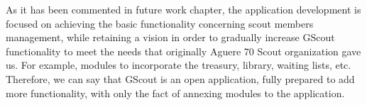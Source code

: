 As it has been commented in future work  chapter, the application development is focused on achieving the basic functionality 
concerning scout members management, while retaining a vision in order to gradually increase GScout functionality 
to meet the needs that originally Aguere 70 Scout organization gave us. For example, modules to incorporate the treasury, library, waiting lists, etc.\\

Therefore, we can say that GScout is an open application, fully prepared to add more functionality, with only the fact of annexing
modules to the application.


